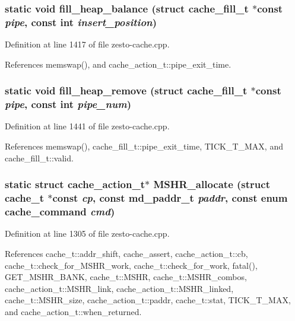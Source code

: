 \subsubsection[{fill\_\-heap\_\-balance}]{\setlength{\rightskip}{0pt plus 5cm}static void fill\_\-heap\_\-balance (struct {\bf cache\_\-fill\_\-t} $\ast$const  {\em pipe}, \/  const int {\em insert\_\-position})\hspace{0.3cm}{\tt  [static]}}\label{zesto-cache_8cpp_45008d7fc6cedc3c5187a70e4cfc1d4a}




Definition at line 1417 of file zesto-cache.cpp.

References memswap(), and cache\_\-action\_\-t::pipe\_\-exit\_\-time.
\subsubsection[{fill\_\-heap\_\-remove}]{\setlength{\rightskip}{0pt plus 5cm}static void fill\_\-heap\_\-remove (struct {\bf cache\_\-fill\_\-t} $\ast$const  {\em pipe}, \/  const int {\em pipe\_\-num})\hspace{0.3cm}{\tt  [static]}}\label{zesto-cache_8cpp_9c8931eb6f26a4862221d39dd688368f}




Definition at line 1441 of file zesto-cache.cpp.

References memswap(), cache\_\-fill\_\-t::pipe\_\-exit\_\-time, TICK\_\-T\_\-MAX, and cache\_\-fill\_\-t::valid.
\subsubsection[{MSHR\_\-allocate}]{\setlength{\rightskip}{0pt plus 5cm}static struct {\bf cache\_\-action\_\-t}$\ast$ MSHR\_\-allocate (struct {\bf cache\_\-t} $\ast$const  {\em cp}, \/  const {\bf md\_\-paddr\_\-t} {\em paddr}, \/  const enum {\bf cache\_\-command} {\em cmd})\hspace{0.3cm}{\tt  [static, read]}}\label{zesto-cache_8cpp_b9e90f1afc77db8eb4dad712b12304ac}




Definition at line 1305 of file zesto-cache.cpp.

References cache\_\-t::addr\_\-shift, cache\_\-assert, cache\_\-action\_\-t::cb, cache\_\-t::check\_\-for\_\-MSHR\_\-work, cache\_\-t::check\_\-for\_\-work, fatal(), GET\_\-MSHR\_\-BANK, cache\_\-t::MSHR, cache\_\-t::MSHR\_\-combos, cache\_\-action\_\-t::MSHR\_\-link, cache\_\-action\_\-t::MSHR\_\-linked, cache\_\-t::MSHR\_\-size, cache\_\-action\_\-t::paddr, cache\_\-t::stat, TICK\_\-T\_\-MAX, and cache\_\-action\_\-t::when\_\-returned.
